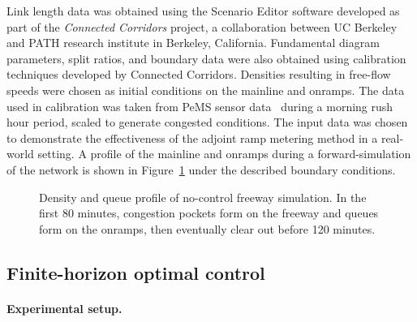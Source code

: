 								
				Link length data was obtained using the Scenario Editor software developed
				as part of the \textit{Connected Corridors} project, a collaboration between
				UC Berkeley and PATH research institute in Berkeley, California.
				Fundamental diagram parameters, split ratios, and boundary data were
				also obtained using calibration techniques developed by Connected
				Corridors. Densities resulting in free-flow speeds were chosen as
				initial conditions on the mainline and onramps. The data used in calibration
				was taken from PeMS sensor data~\cite{Chen2003} during a morning rush hour period,
				scaled to generate congested conditions. The input data was chosen
				to demonstrate the effectiveness of the adjoint ramp metering method
				in a real-world setting. A profile of the mainline and onramps during
				a forward-simulation of the network is shown in Figure~\ref{fig:Density-and-queue}
				under the described boundary conditions.
				\begin{figure}[b]
					\hfill{}
																
								\caption{Density and queue profile of no-control freeway simulation. In the
									first 80 minutes, congestion pockets form on the freeway and queues
									form on the onramps, then eventually clear out before 120 minutes.\label{fig:Density-and-queue}}
							\end{figure}
														
														
														
							\subsection{Finite-horizon optimal control\label{sub:Finite-horizon-optimal-control}}
														
														
							\paragraph{Experimental setup.}
														

